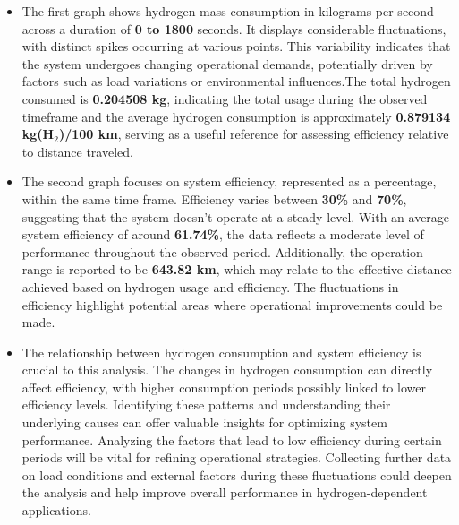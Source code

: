 \documentclass[12pt,a4paper]{article}
\numberwithin{equation}{section}
\begin{document}
\begin{itemize}
	\item The first graph shows hydrogen mass consumption in kilograms per second across a duration of \textbf{0 to 1800} seconds. It displays considerable fluctuations, with distinct spikes occurring at various points. This variability indicates that the system undergoes changing operational demands, potentially driven by factors such as load variations or environmental influences.The total hydrogen consumed is \textbf{0.204508 kg}, indicating the total usage during the observed timeframe and the average hydrogen consumption is approximately \textbf{0.879134 kg(H$_2$)/100 km}, serving as a useful reference for assessing efficiency relative to distance traveled. 
	
	\item The second graph focuses on system efficiency, represented as a percentage, within the same time frame. Efficiency varies between \textbf{30\%} and \textbf{70\%}, suggesting that the system doesn't operate at a steady level. With an average system efficiency of around \textbf{61.74\%}, the data reflects a moderate level of performance throughout the observed period. Additionally, the operation range is reported to be \textbf{643.82 km}, which may relate to the effective distance achieved based on hydrogen usage and efficiency. The fluctuations in efficiency highlight potential areas where operational improvements could be made.
	\item The relationship between hydrogen consumption and system efficiency is crucial to this analysis. The changes in hydrogen consumption can directly affect efficiency, with higher consumption periods possibly linked to lower efficiency levels. Identifying these patterns and understanding their underlying causes can offer valuable insights for optimizing system performance. Analyzing the factors that lead to low efficiency during certain periods will be vital for refining operational strategies. Collecting further data on load conditions and external factors during these fluctuations could deepen the analysis and help improve overall performance in hydrogen-dependent applications.
\end{itemize}
\end{document}
